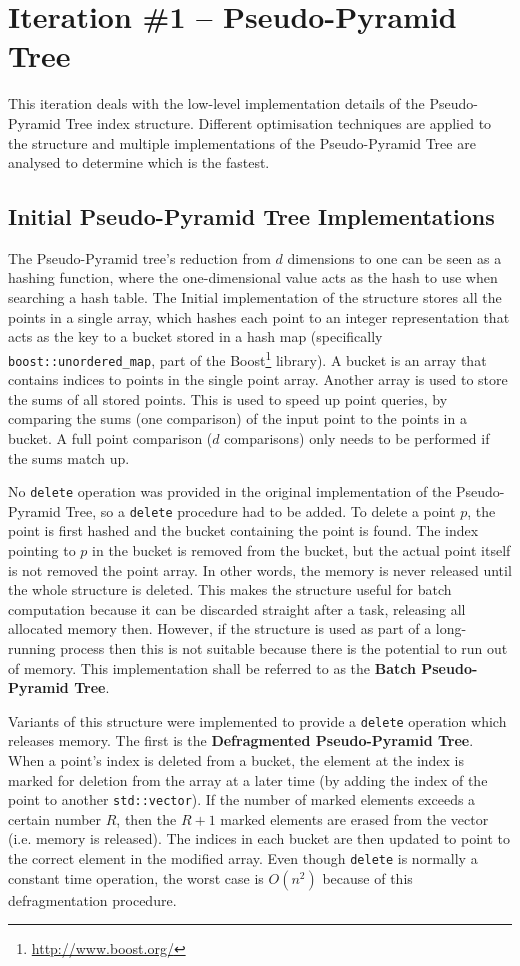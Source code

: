 \section{Iteration \#1 -- Pseudo-Pyramid Tree}

This iteration deals with the low-level implementation details of the Pseudo-Pyramid Tree index structure. Different optimisation techniques are applied to the structure and  multiple implementations of the Pseudo-Pyramid Tree are analysed to determine which is the fastest.

\subsection{Initial Pseudo-Pyramid Tree Implementations}

The Pseudo-Pyramid tree's reduction from $d$ dimensions to one can be seen as a hashing function, where the one-dimensional value acts as the hash to use when searching a hash table. The Initial implementation of the structure stores all the points in a single array, which hashes each point to an integer representation that acts as the key to a bucket stored in a hash map (specifically \texttt{boost::unordered\_map}, part of the Boost\footnote{\url{http://www.boost.org/}} library). A bucket is an array that contains indices to points in the single point array. Another array is used to store the sums of all stored points. This is used to speed up point queries, by comparing the sums (one comparison) of the input point to the points in a bucket. A full point comparison ($d$ comparisons) only needs to be performed if the sums match up.

No \texttt{delete} operation was provided in the original implementation of the Pseudo-Pyramid Tree, so a \texttt{delete} procedure had to be added. To delete a point $p$, the point is first hashed and the bucket containing the point is found. The index pointing to $p$ in the bucket is removed from the bucket, but the actual point itself is not removed the point array. In other words, the memory is never released until the whole structure is deleted. This makes the structure useful for batch computation because it can be discarded straight after a task, releasing all allocated memory then. However, if the structure is used as part of a long-running process then this is not suitable because there is the potential to run out of memory. This implementation shall be referred to as the \textbf{Batch Pseudo-Pyramid Tree}.

Variants of this structure were implemented to provide a \texttt{delete} operation which releases memory. The first is the \textbf{Defragmented Pseudo-Pyramid Tree}. When a point's index is deleted from a bucket, the element at the index is marked for deletion from the array at a later time (by adding the index of the point to another \texttt{std::vector}). If the number of marked elements exceeds a certain number $R$, then the $R + 1$ marked elements are erased from the vector (i.e. memory is released). The indices in each bucket are then updated to point to the correct element in the modified array. Even though \texttt{delete} is normally a constant time operation, the worst case is $O(n^2)$ because of this defragmentation procedure.

